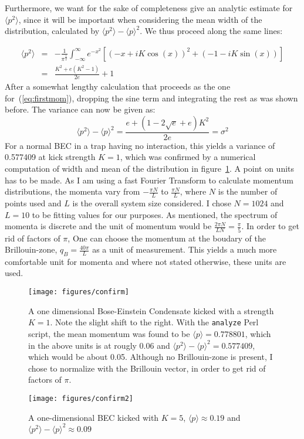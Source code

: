 Furthermore, we want for the sake of completeness give an analytic estimate for $\langle p^2 \rangle$, since it
will be important when considering the mean width of the distribution, calculated by $\langle p^2 \rangle -
\langle p \rangle^2$. We thus proceed along the same lines:

\begin{eqnarray}
\langle p^2 \rangle &=&
-\frac{1}{\pi^{\frac{1}{2}}}\int_{-\infty}^{\infty}e^{-x^2}\left[(-x+iK\cos(x))^2+(-1-iK\sin(x))\right]\nonumber\\
		{}&=&\frac{K^2+e(K^2-1)}{2e}+1\label{eq:secmom}
\end{eqnarray}
After a somewhat lengthy calculation that proceeds as the one for~(\ref{eq:firstmom}), dropping the sine term and
integrating the rest as was shown before.
The variance can now be given as:
\begin{equation}\label{eq:variance}
	 \langle p^2 \rangle-\langle p \rangle^2=\frac{e+(1-2\sqrt{e}+e)K^2}{2e}=\sigma^2
\end{equation}
For a normal BEC in a trap having no interaction, this yields a variance of 0.577409 at kick strength $K=1$, which
was confirmed by a numerical computation of width and mean of the distribution in figure~\ref{fig:confirm}. A point on units has to be made. As I am using a fast Fourier Transform to calculate momentum distributions, the momenta vary from $-\frac{\pi N}{L}$ to $\frac{\pi N}{L}$, where $N$ is the number of points used and $L$ is the overall system size considered. I chose $N=1024$ and $L=10$ to be fitting values for our purposes. As mentioned, the spectrum of momenta is discrete and the unit of momentum would be $\frac{2\pi N}{LN}=\frac{\pi}{5}$. In order to get rid of factors of $\pi$, 
One can choose the momentum at the boudary of the Brillouin-zone, $q_B=\frac{40\pi}{L}$ as a unit of measurement. This yields a much more comfortable unit for momenta and where not stated otherwise, these units are used.

\begin{figure}[H]
\begin{center}
\texttt{[image: figures/confirm]}
\caption{A one dimensional Bose-Einstein Condensate kicked with a strength $K=1$. Note the slight shift to the
right. With the \texttt{analyze} Perl script, the mean momentum was found to be $\langle p \rangle=0.778801$, which in the above units is at rougly 0.06 and
$\langle p^2 \rangle-\langle p \rangle^2=0.577409$, which would be about 0.05. Although no Brillouin-zone is present, I chose to normalize
with the Brillouin vector, in order to get rid of factors of $\pi$.}
\label{fig:confirm}
\end{center}
\end{figure}

\begin{figure}[H]
\begin{center}
\texttt{[image: figures/confirm2]}
\caption{A one-dimensional BEC kicked with $K=5$, $\langle p \rangle\approx0.19$ and $\langle p^2\rangle - \langle p \rangle^2\approx 0.09$}
\label{fig:confirm2}
\end{center}
\end{figure}

